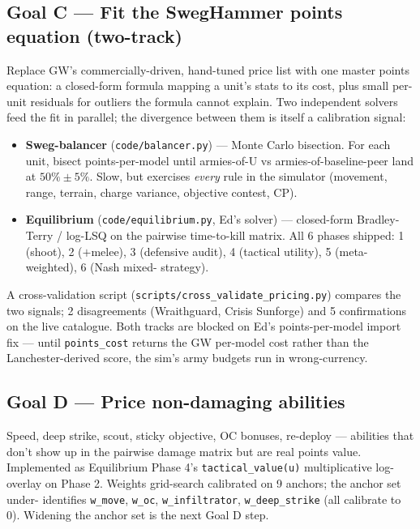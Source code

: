\documentclass[11pt,a4paper]{article}
\begin{document}
\subsection*{Goal C --- Fit the SwegHammer points equation (two-track)}
Replace GW's commercially-driven, hand-tuned price list with one master
points equation: a closed-form formula mapping a unit's stats to its
cost, plus small per-unit residuals for outliers the formula cannot
explain. Two independent solvers feed the fit in parallel; the
divergence between them is itself a calibration signal:

\begin{itemize}[itemsep=2pt]
  \item \textbf{Sweg-balancer} (\texttt{code/balancer.py}) ---
    Monte Carlo bisection. For each unit, bisect points-per-model until
    armies-of-U vs armies-of-baseline-peer land at $50\% \pm 5\%$. Slow,
    but exercises \emph{every} rule in the simulator (movement, range,
    terrain, charge variance, objective contest, CP).
  \item \textbf{Equilibrium} (\texttt{code/equilibrium.py}, Ed's solver)
    --- closed-form Bradley-Terry / log-LSQ on the pairwise time-to-kill
    matrix. All 6 phases shipped: 1 (shoot), 2 ($+$melee), 3 (defensive
    audit), 4 (tactical utility), 5 (meta-weighted), 6 (Nash mixed-
    strategy).
\end{itemize}

A cross-validation script (\texttt{scripts/cross\_validate\_pricing.py})
compares the two signals; 2 disagreements (Wraithguard, Crisis Sunforge)
and 5 confirmations on the live catalogue. Both tracks are blocked on
Ed's points-per-model import fix --- until \texttt{points\_cost}
returns the GW per-model cost rather than the Lanchester-derived score,
the sim's army budgets run in wrong-currency.

\subsection*{Goal D --- Price non-damaging abilities}
Speed, deep strike, scout, sticky objective, OC bonuses, re-deploy ---
abilities that don't show up in the pairwise damage matrix but are real
points value. Implemented as Equilibrium Phase 4's
\texttt{tactical\_value(u)} multiplicative log-overlay on Phase 2.
Weights grid-search calibrated on 9 anchors; the anchor set under-
identifies \texttt{w\_move}, \texttt{w\_oc}, \texttt{w\_infiltrator},
\texttt{w\_deep\_strike} (all calibrate to 0). Widening the anchor set
is the next Goal D step.
\end{document}
